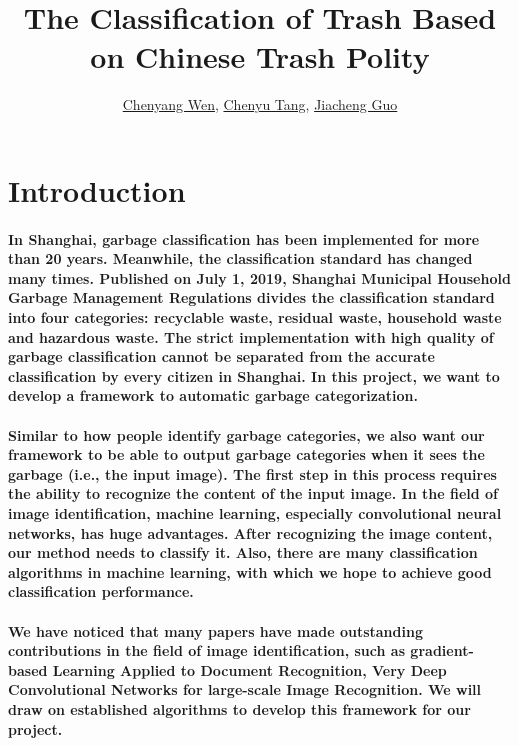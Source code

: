 \documentclass{article}
\title{The Classification of Trash Based on Chinese Trash Polity}
\author{\href{mailto:cw3923@nyu.edu}{Chenyang Wen}, \href{mailto:ct2831@nyu.edu}{Chenyu Tang},
\href{mailto:jg5315@nyu.edu}{Jiacheng Guo}}
\date{\vspace{-5ex}} %
\begin{document}
\maketitle
\thispagestyle{firstpage}

\section*{Introduction}

\paragraph{In Shanghai, garbage classification has been implemented for more than 20 years. Meanwhile, the classification standard has changed many times. Published on July 1, 2019, Shanghai Municipal Household Garbage Management Regulations divides the classification standard into four categories: recyclable waste, residual waste, household waste and hazardous waste.  The strict implementation with high quality of garbage classification cannot be separated from the accurate classification by every citizen in Shanghai. In this project, we want to develop a framework to automatic garbage categorization.}

\paragraph{Similar to how people identify garbage categories, we also want our framework to be able to output garbage categories when it sees the garbage (i.e., the input image).  The first step in this process requires the ability to recognize the content of the input image. In the field of image identification, machine learning, especially convolutional neural networks, has huge advantages.  After recognizing the image content, our method needs to classify it. Also, there are many classification algorithms in machine learning, with which we hope to achieve good classification performance.}

\paragraph{We have noticed that many papers have made outstanding contributions in the field of image identification, such as gradient-based Learning Applied to Document Recognition, Very Deep Convolutional Networks for large-scale Image Recognition. We will draw on established algorithms to develop this framework for our project.}
\end{document}

